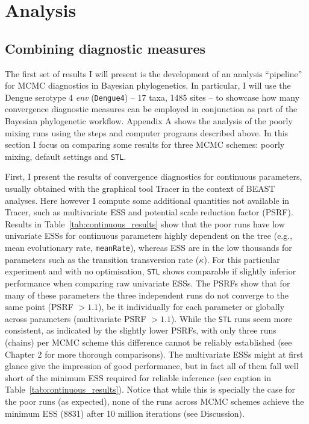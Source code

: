 \section{Analysis}
\label{sec:results}

\subsection{Combining diagnostic measures}
\label{sec:combining}

The first set of results I will present is the development of an analysis ``pipeline'' for MCMC diagnostics in Bayesian phylogenetics.
In particular, I will use the Dengue serotype 4 \textit{env} (\verb|Dengue4|) -- 17 taxa, 1485 sites -- to showcase how many convergence diagnostic measures can be employed in conjunction as part of the Bayesian phylogenetic workflow.
Appendix A shows the analysis of the poorly mixing runs using the steps and computer programs described above.
In this section I focus on comparing some results for three MCMC schemes: poorly mixing, default settings and \verb|STL|.

First, I present the results of convergence diagnostics for continuous parameters, usually obtained with the graphical tool Tracer in the context of BEAST analyses.
Here however I compute some additional quantities not available in Tracer, such as multivariate ESS and potential scale reduction factor (PSRF).
Results in Table~\ref{tab:continuous_results} show that the poor runs have low univariate ESSs for continuous parameters highly dependent on the tree (e.g., mean evolutionary rate, \verb|meanRate|), whereas ESS are in the low thousands for parameters such as the transition transversion rate ($\kappa$).
For this particular experiment and with no optimisation, \verb|STL| shows comparable if slightly inferior performance when comparing raw univariate ESSs.
The PSRFs show that for many of these parameters the three independent runs do not converge to the same point (PSRF $> 1.1$), be it individually for each parameter or globally across parameters (multivariate PSRF $> 1.1$).
While the \verb|STL| runs seem more consistent, as indicated by the slightly lower PSRFs, with only three runs (chains) per MCMC scheme this difference cannot be reliably established (see Chapter 2 for more thorough comparisons).
The multivariate ESSs might at first glance give the impression of good performance, but in fact all of them fall well short of the minimum ESS required for reliable inference (see caption in Table~\ref{tab:continuous_results}).
Notice that while this is specially the case for the poor runs (as expected), none of the runs across MCMC schemes achieve the minimum ESS (8831) after 10 million iterations (see Discussion).

